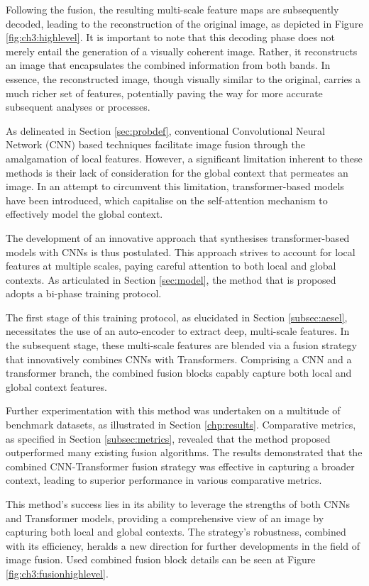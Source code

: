 Following the fusion, the resulting multi-scale feature maps are subsequently decoded, leading to the reconstruction of the original image, as depicted in Figure \ref{fig:ch3:highlevel}. It is important to note that this decoding phase does not merely entail the generation of a visually coherent image. Rather, it reconstructs an image that encapsulates the combined information from both bands. In essence, the reconstructed image, though visually similar to the original, carries a much richer set of features, potentially paving the way for more accurate subsequent analyses or processes.

As delineated in Section \ref{sec:probdef}, conventional Convolutional Neural Network (CNN) based techniques facilitate image fusion through the amalgamation of local features. However, a significant limitation inherent to these methods is their lack of consideration for the global context that permeates an image. In an attempt to circumvent this limitation, transformer-based models have been introduced, which capitalise on the self-attention mechanism to effectively model the global context.

The development of an innovative approach that synthesises transformer-based models with CNNs is thus postulated. This approach strives to account for local features at multiple scales, paying careful attention to both local and global contexts. As articulated in Section \ref{sec:model}, the method that is proposed adopts a bi-phase training protocol.

The first stage of this training protocol, as elucidated in Section \ref{subsec:aesel}, necessitates the use of an auto-encoder to extract deep, multi-scale features. In the subsequent stage, these multi-scale features are blended via a fusion strategy that innovatively combines CNNs with Transformers. Comprising a CNN and a transformer branch, the combined fusion blocks capably capture both local and global context features.

Further experimentation with this method was undertaken on a multitude of benchmark datasets, as illustrated in Section \ref{chp:results}. Comparative metrics, as specified in Section \ref{subsec:metrics}, revealed that the method proposed outperformed many existing fusion algorithms. The results demonstrated that the combined CNN-Transformer fusion strategy was effective in capturing a broader context, leading to superior performance in various comparative metrics. 

This method's success lies in its ability to leverage the strengths of both CNNs and Transformer models, providing a comprehensive view of an image by capturing both local and global contexts. The strategy's robustness, combined with its efficiency, heralds a new direction for further developments in the field of image fusion. Used combined fusion block details can be seen at Figure \ref{fig:ch3:fusionhighlevel}.


